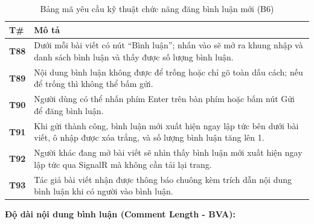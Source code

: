 \documentclass[11pt,a4paper]{article}
\begin{document}
\begin{table}[H]
\centering
\small
\begin{tabularx}{\textwidth}{|C{1.5cm}|X|}
\hline
{}
\textbf{T\#} & \textbf{Mô tả} \tabularnewline
\hline
\textbf{T88} & Dưới mỗi bài viết có nút ``Bình luận''; nhấn vào sẽ mở ra khung nhập và danh sách bình luận và thấy được số lượng bình luận. \\ \hline
\textbf{T89} & Nội dung bình luận không được để trống hoặc chỉ gõ toàn dấu cách; nếu để trống thì không thể bấm gửi. \\ \hline
\textbf{T90} & Người dùng có thể nhấn phím Enter trên bàn phím hoặc bấm nút Gửi để đăng bình luận. \\ \hline
\textbf{T91} & Khi gửi thành công, bình luận mới xuất hiện ngay lập tức bên dưới bài viết, ô nhập được xóa trắng, và số lượng bình luận tăng lên 1. \\ \hline
\textbf{T92} & Người khác đang mở bài viết sẽ nhìn thấy bình luận mới xuất hiện ngay lập tức qua SignalR mà không cần tải lại trang. \\ \hline
\textbf{T93} & Tác giả bài viết nhận được thông báo chuông kèm trích dẫn nội dung bình luận khi có người vào bình luận. \\ \hline
\end{tabularx}
\caption{Bảng mã yêu cầu kỹ thuật chức năng đăng bình luận mới (B6)}
\end{table}

\noindent\textbf{Độ dài nội dung bình luận (Comment Length - BVA):}
\begin{center}
\end{center}
\end{document}
